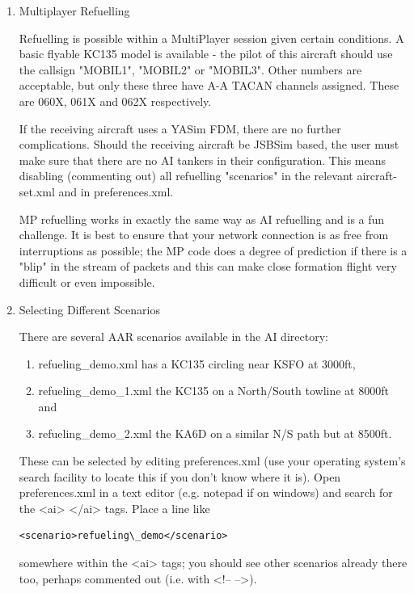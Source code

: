 \begin{enumerate}

\item Multiplayer Refuelling

Refuelling is possible within a MultiPlayer session given certain
conditions.  A basic flyable KC135 model is available - the pilot of
this aircraft should use the callsign "MOBIL1", "MOBIL2" or "MOBIL3". 
Other numbers are acceptable, but only these three have A-A TACAN
channels assigned.  These are 060X, 061X and 062X respectively.

If the receiving aircraft uses a YASim FDM, there are no further
complications.  Should the receiving aircraft be JSBSim based, the user
must make sure that there are no AI tankers in their configuration. 
This means disabling (commenting out) all refuelling "scenarios" in the
relevant aircraft-set.xml and in preferences.xml.

MP refuelling works in exactly the same way as AI refuelling and is a
fun challenge.  It is best to ensure that your network connection is as
free from interruptions as possible; the MP code does a degree of
prediction if there is a "blip" in the stream of packets and this can
make close formation flight very difficult or even impossible.

\item Selecting Different Scenarios

There are several AAR scenarios available in the AI directory:
\begin{enumerate}
\item refueling\_demo.xml has a KC135 circling near KSFO at 3000ft,
\item refueling\_demo\_1.xml the KC135 on a North/South towline at 8000ft and
\item refueling\_demo\_2.xml the KA6D on a similar N/S path but at 8500ft.
\end{enumerate}

These can be selected by editing preferences.xml (use your operating
system's search facility to locate this if you don't know where it is). 
Open preferences.xml in a text editor (e.g. notepad if on windows) and
search for the <ai> </ai> tags.  Place a line like
\begin{verbatim}
<scenario>refueling\_demo</scenario>
\end{verbatim}
somewhere within the <ai> tags; you should see other scenarios already
there too, perhaps commented out (i.e. with <!-- -->).

\end{enumerate}

